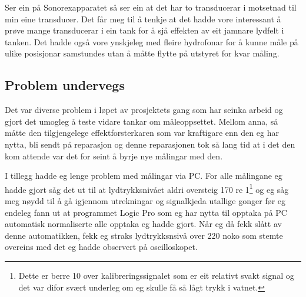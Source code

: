 Ser ein på Sonorexapparatet så ser ein at det har to transducerar i motsetnad til min eine transducer. Det får meg til å tenkje at det hadde vore interessant å prøve mange transducerar i ein tank for å sjå effekten av eit jamnare lydfelt i tanken. Det hadde også vore ynskjeleg med fleire hydrofonar for å kunne måle på ulike posisjonar samstundes utan å måtte flytte på utstyret for kvar måling.

\subsection{Problem undervegs}
Det var diverse problem i løpet av prosjektets gang som har seinka arbeid og gjort det umogleg å teste vidare tankar om måleoppsettet. Mellom anna, så måtte den tilgjengelege effektforsterkaren som var kraftigare enn den eg har nytta, bli sendt på reparasjon og denne reparasjonen tok så lang tid at i det den kom attende var det for seint å byrje nye målingar med den.  

I tillegg hadde eg lenge problem med målingar via PC. For alle målingane eg hadde gjort såg det ut til at lydtrykksnivået aldri oversteig \unit{170}{\deci\bel} re \unit{1}{\micro\pascal}\footnote{Dette er berre \unit{10}{\deci\bel} over kalibreringssignalet som er eit relativt svakt signal og det var difor svært underleg om eg skulle få så lågt trykk i vatnet.} og eg såg meg nøydd til å gå igjennom utrekningar og signalkjeda utallige gonger før eg endeleg fann ut at programmet Logic Pro som eg har nytta til opptaka på PC automatisk normaliserte alle opptaka eg hadde gjort. Når eg då fekk slått av denne automatikken, fekk eg straks lydtrykksnsivå over \unit{220}{\deci\bel} noko som stemte overeins med det eg hadde observert på oscilloskopet.